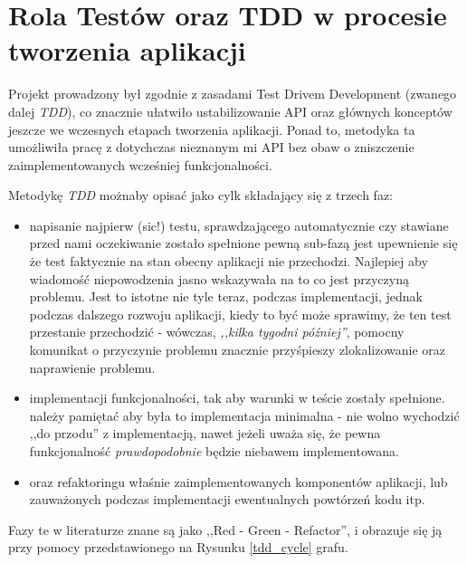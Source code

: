 \documentclass[pdflatex,11pt]{aghdpl}
\begin{document}
\chapter{Rola Testów oraz TDD w procesie tworzenia aplikacji}
\label{chapter:tdd}

Projekt prowadzony był zgodnie z zasadami Test Drivem Development (zwanego dalej \textit{TDD}),
co znacznie ułatwiło ustabilizowanie API oraz głównych konceptów jeszcze we wczesnych etapach tworzenia aplikacji.
Ponad to, metodyka ta umożliwiła pracę z dotychczas nieznanym mi API bez obaw o zniszczenie zaimplementowanych wcześniej funkcjonalności.

Metodykę \textit{TDD} możnaby opisać jako cylk składający się z trzech faz:
\begin{itemize}
 \item napisanie najpierw \small{(sic!)} testu, sprawdzającego automatycznie czy stawiane przed nami oczekiwanie zostało spełnione
 \subitem pewną sub-fazą jest upewnienie się że test faktycznie na stan obecny aplikacji nie przechodzi. Najlepiej aby wiadomość niepowodzenia
          jasno wskazywała na to co jest przyczyną problemu. Jest to istotne nie tyle teraz, podczas implementacji, jednak podczas dalszego rozwoju aplikacji,
          kiedy to być może sprawimy, że ten test przestanie przechodzić - wówczas, \textit{,,kilka tygodni później''}, pomocny komunikat o przyczynie problemu 
          znacznie przyśpieszy zlokalizowanie oraz naprawienie problemu.
 \item implementacji funkcjonalności, tak aby warunki w teście zostały spełnione.
  \subitem należy pamiętać aby była to implementacja minimalna - nie wolno wychodzić ,,do przodu'' z implementacją, nawet jeżeli uważa się,
           że pewna funkcjonalność \textit{prawdopodobnie} będzie niebawem implementowana.
 \item oraz refaktoringu właśnie zaimplementowanych komponentów aplikacji, lub zauważonych podczas implementacji ewentualnych powtórzeń kodu itp.
\end{itemize}

Fazy te w literaturze znane są jako ,,Red - Green - Refactor'', i obrazuje się ją przy pomocy przedstawionego na Rysunku \ref{tdd_cycle} grafu.
\end{document}
